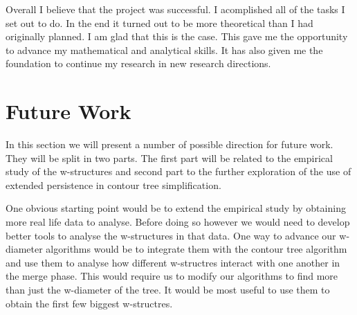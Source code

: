 Overall I believe that the project was successful. I acomplished all of the tasks I set out to do. In the end it turned out to be more theoretical than I had originally planned. I am glad that this is the case. This gave me the opportunity to advance my mathematical and analytical skills. It has also given me the foundation to continue my research in new research directions.


%
%
%
%


%



\section{Future Work}

In this section we will present a number of possible direction for future work. They will be split in two parts. The first part will be related to the empirical study of the w-structures and second part to the further exploration of the use of extended persistence in contour tree simplification.

One obvious starting point would be to extend the empirical study by obtaining more real life data to analyse. Before doing so however we would need to develop better tools to analyse the w-structures in that data. One way to advance our w-diameter algorithms would be to integrate them with the contour tree algorithm and use them to analyse how different w-structres interact with one another in the merge phase. This would require us to modify our algorithms to find more than just the w-diameter of the tree. It would be most useful to use them to obtain the first few biggest w-structres.

